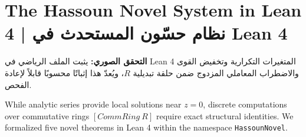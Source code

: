 \documentclass[11pt,a4paper]{article}
\theoremstyle{definition}
\begin{document}
\section{The Hassoun Novel System in Lean 4 | نظام حسّون المستحدث في Lean 4}

\begin{Arabic}
\begin{flushright}
\textbf{التحقق الصوري:} يثبت الملف الرياضي في Lean 4 المتغيرات التكرارية وتخفيض القوى والاضطراب المعاملي المزدوج ضمن حلقة تبديلية $R$، ويُعدّ هذا إثباتًا محسوبًا قابلاً لإعادة الفحص.
\end{flushright}
\end{Arabic}

While analytic series provide local solutions near $z=0$, discrete computations over commutative rings $[CommRing\ R]$ require exact structural identities. We formalized five novel theorems in Lean 4 within the namespace \texttt{HassounNovel}.
\end{document}
